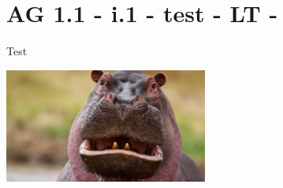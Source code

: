 \section{AG 1.1 - i.1 - test - LT - }

\begin{beispiel}[AG 1.1]{1}
Test

\includegraphics[width=0.5\textwidth]{../_database_inoffiziell/Bilder/AG11_1001_hippo.eps}
\end{beispiel}
